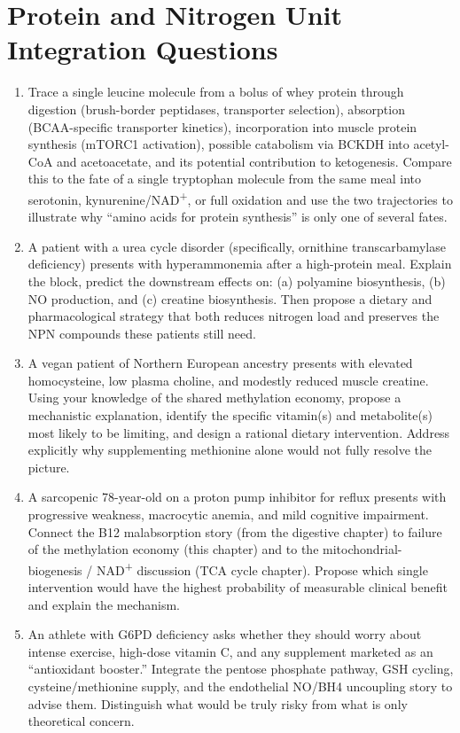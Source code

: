 \documentclass{tufte-handout}
\begin{document}
\section{Protein and Nitrogen Unit Integration Questions}\label{sec:protein-integration}
\begin{enumerate}
\item Trace a single leucine molecule from a bolus of whey protein through digestion (brush-border peptidases, transporter selection), absorption (BCAA-specific transporter kinetics), incorporation into muscle protein synthesis (mTORC1 activation), possible catabolism via BCKDH into acetyl-CoA and acetoacetate, and its potential contribution to ketogenesis. Compare this to the fate of a single tryptophan molecule from the same meal into serotonin, kynurenine/NAD\textsuperscript{+}, or full oxidation and use the two trajectories to illustrate why ``amino acids for protein synthesis'' is only one of several fates.
\item A patient with a urea cycle disorder (specifically, ornithine transcarbamylase deficiency) presents with hyperammonemia after a high-protein meal. Explain the block, predict the downstream effects on: (a) polyamine biosynthesis, (b) NO production, and (c) creatine biosynthesis. Then propose a dietary and pharmacological strategy that both reduces nitrogen load and preserves the NPN compounds these patients still need.
\item A vegan patient of Northern European ancestry presents with elevated homocysteine, low plasma choline, and modestly reduced muscle creatine. Using your knowledge of the shared methylation economy, propose a mechanistic explanation, identify the specific vitamin(s) and metabolite(s) most likely to be limiting, and design a rational dietary intervention. Address explicitly why supplementing methionine alone would not fully resolve the picture.
\item A sarcopenic 78-year-old on a proton pump inhibitor for reflux presents with progressive weakness, macrocytic anemia, and mild cognitive impairment. Connect the B12 malabsorption story (from the digestive chapter) to failure of the methylation economy (this chapter) and to the mitochondrial-biogenesis / NAD\textsuperscript{+} discussion (TCA cycle chapter). Propose which single intervention would have the highest probability of measurable clinical benefit and explain the mechanism.
\item An athlete with G6PD deficiency asks whether they should worry about intense exercise, high-dose vitamin C, and any supplement marketed as an ``antioxidant booster.'' Integrate the pentose phosphate pathway, GSH cycling, cysteine/methionine supply, and the endothelial NO/BH4 uncoupling story to advise them. Distinguish what would be truly risky from what is only theoretical concern.

\end{enumerate}
\end{document}
